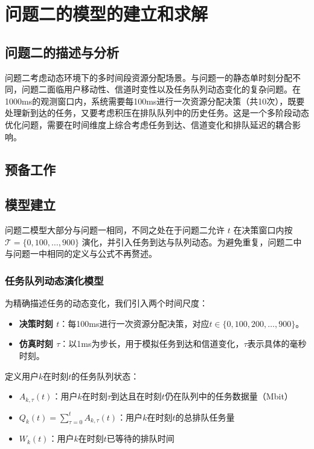 \section{问题二的模型的建立和求解}
\subsection{问题二的描述与分析}

问题二考虑动态环境下的多时间段资源分配场景。与问题一的静态单时刻分配不同，问题二面临用户移动性、信道时变性以及任务队列动态变化的复杂问题。在1000ms的观测窗口内，系统需要每100ms进行一次资源分配决策（共10次），既要处理新到达的任务，又要考虑积压在排队队列中的历史任务。这是一个多阶段动态优化问题，需要在时间维度上综合考虑任务到达、信道变化和排队延迟的耦合影响。

\subsection{预备工作}

\subsection{模型建立}

问题二模型大部分与问题一相同，不同之处在于问题二允许 $t$ 在决策窗口内按 $\mathcal{T}=\{0,100,\dots,900\}$ 演化，并引入任务到达与队列动态。为避免重复，问题二中与问题一中相同的定义与公式不再赘述。

\subsubsection{任务队列动态演化模型}

为精确描述任务的动态变化，我们引入两个时间尺度：
\begin{itemize}
    \item \textbf{决策时刻 $t$}：每100ms进行一次资源分配决策，对应$t \in \{0, 100, 200, \ldots, 900\}$。
    \item \textbf{仿真时刻 $\tau$}：以1ms为步长，用于模拟任务到达和信道变化，$\tau$表示具体的毫秒时刻。
\end{itemize}

定义用户$k$在时刻$t$的任务队列状态：

\begin{itemize}
  \item $A_{k,\tau}(t)$：用户$k$在时刻$\tau$到达且在时刻$t$仍在队列中的任务数据量（Mbit）
  \item $Q_k(t) = \sum_{\tau=0}^{t} A_{k,\tau}(t)$：用户$k$在时刻$t$的总排队任务量
  \item $W_k(t)$：用户$k$在时刻$t$已等待的排队时间
\end{itemize}

